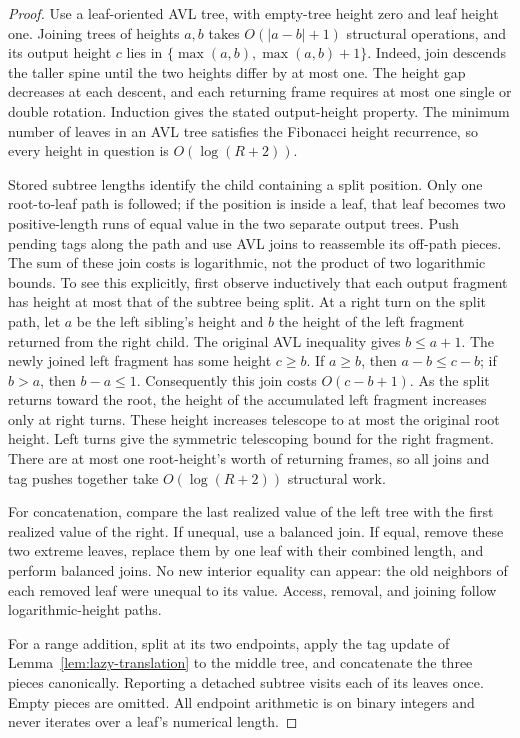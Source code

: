 \begin{proof}
Use a leaf-oriented AVL tree, with empty-tree height zero and leaf height
one. Joining trees of heights $a,b$ takes $O(|a-b|+1)$ structural operations,
and its output height $c$ lies in
$\{\max(a,b),\max(a,b)+1\}$. Indeed, join descends the taller spine until
the two heights differ by at most one. The height gap decreases at each
descent, and each returning frame requires at most one single or double
rotation. Induction gives the stated output-height property. The minimum
number of leaves in an AVL tree satisfies the Fibonacci height recurrence,
so every height in question is $O(\log(R+2))$.

Stored subtree lengths identify the child containing a split position.
Only one root-to-leaf path is followed; if the position is inside a leaf,
that leaf becomes two positive-length runs of equal value in the two
separate output trees. Push pending tags along the path and use AVL joins
to reassemble its off-path pieces. The sum of these join costs is
logarithmic, not the product of two logarithmic bounds. To see this
explicitly, first observe inductively that each output fragment has height
at most that of the subtree being split. At a right turn on the split path,
let $a$ be the left sibling's height and $b$ the height of the left fragment
returned from the right child. The original AVL inequality gives
$b\le a+1$. The newly joined left fragment has some height $c\ge b$.
If $a\ge b$, then $a-b\le c-b$; if $b>a$, then $b-a\le1$.
Consequently this join costs $O(c-b+1)$. As the split returns toward the
root, the height of the accumulated left fragment increases only at right
turns. These height increases telescope to at most the original root
height. Left turns give the symmetric telescoping bound for the right
fragment. There are at most one root-height's worth of returning frames,
so all joins and tag pushes together take $O(\log(R+2))$ structural work.

For concatenation, compare the last realized value of the left tree with
the first realized value of the right. If unequal, use a balanced join.
If equal, remove these two extreme leaves, replace them by one leaf with
their combined length, and perform balanced joins. No new interior equality
can appear: the old neighbors of each removed leaf were unequal to its
value. Access, removal, and joining follow logarithmic-height paths.

For a range addition, split at its two endpoints, apply the tag update of
Lemma~\ref{lem:lazy-translation} to the middle tree, and concatenate the
three pieces canonically. Reporting a detached subtree visits each of its
leaves once. Empty pieces are omitted. All endpoint arithmetic is on binary
integers and never iterates over a leaf's numerical length.
\end{proof}

